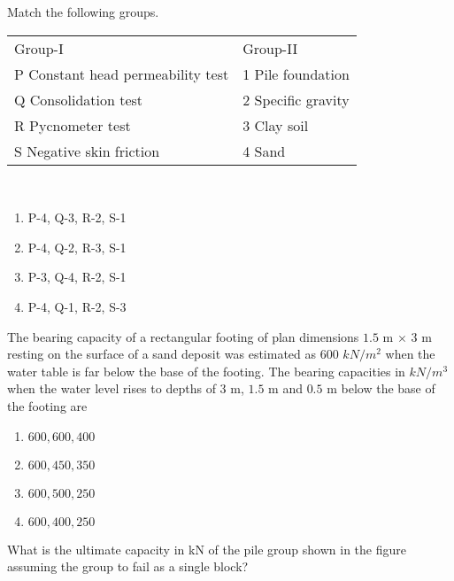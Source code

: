 	  \item Match the following groups.\\
		  \begin{tabular}{ll} 
			  Group-I & Group-II \\
			  P Constant head permeability test & 1 Pile foundation \\
			  Q Consolidation test & 2 Specific gravity \\
			  R Pycnometer test & 3 Clay soil \\
			  S Negative skin friction & 4 Sand \\
		  \end{tabular}\\
		  \begin{enumerate}
			  \item P-4, Q-3, R-2, S-1
			  \item P-4, Q-2, R-3, S-1
			  \item P-3, Q-4, R-2, S-1
			  \item P-4, Q-1, R-2, S-3\\
		  \end{enumerate}
	  \item The bearing capacity of a rectangular footing of plan dimensions $1.5$ m
$\times$ $3$ m resting on the surface of a sand deposit was estimated as $600$ $kN/m^2$ when the water table is far below the base of the footing. The bearing capacities in $kN/m^3$ when the water level rises to depths of $3$ m, $1.5$ m and $0.5$ m below the base of the footing are 
                  \begin{enumerate}
			  \item $600,600,400$
			  \item $600,450,350$
			  \item $600,500,250$
			  \item $600,400,250$\\
		  \end{enumerate}
	  \item What is the ultimate capacity in kN of the pile group shown in the figure assuming the group to fail as a single block?\\

